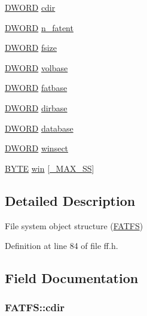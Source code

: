 \begin{DoxyCompactItemize}
\item 
\hyperlink{integer_8h_ad342ac907eb044443153a22f964bf0af}{D\+W\+O\+RD} \hyperlink{structFATFS_a217d0ce0c8cec84aa7f0c142679412c6}{cdir}
\item 
\hyperlink{integer_8h_ad342ac907eb044443153a22f964bf0af}{D\+W\+O\+RD} \hyperlink{structFATFS_a8da50eeba6469bc20d60ca0cf9a1307c}{n\+\_\+fatent}
\item 
\hyperlink{integer_8h_ad342ac907eb044443153a22f964bf0af}{D\+W\+O\+RD} \hyperlink{structFATFS_a53e9560659f14e66f306c2c444198bf3}{fsize}
\item 
\hyperlink{integer_8h_ad342ac907eb044443153a22f964bf0af}{D\+W\+O\+RD} \hyperlink{structFATFS_a8f0ca578755749d204f59dc83f1a7649}{volbase}
\item 
\hyperlink{integer_8h_ad342ac907eb044443153a22f964bf0af}{D\+W\+O\+RD} \hyperlink{structFATFS_a848fba02c4aabe02ef2984e578f33d64}{fatbase}
\item 
\hyperlink{integer_8h_ad342ac907eb044443153a22f964bf0af}{D\+W\+O\+RD} \hyperlink{structFATFS_a3f72fd998dbcce4652a85a81fe944bc4}{dirbase}
\item 
\hyperlink{integer_8h_ad342ac907eb044443153a22f964bf0af}{D\+W\+O\+RD} \hyperlink{structFATFS_a5b6c0bc2e9fd2ae8ef714210a74a2d5d}{database}
\item 
\hyperlink{integer_8h_ad342ac907eb044443153a22f964bf0af}{D\+W\+O\+RD} \hyperlink{structFATFS_ac60e69c00e6bf7c25febfbac4dc1476b}{winsect}
\item 
\hyperlink{integer_8h_a4ae1dab0fb4b072a66584546209e7d58}{B\+Y\+TE} \hyperlink{structFATFS_a7cc35a593465e727ab87723c14610644}{win} \mbox{[}\hyperlink{ffconf_8h_ac271b697378912f17132cb9c7d0de024}{\+\_\+\+M\+A\+X\+\_\+\+SS}\mbox{]}
\end{DoxyCompactItemize}


\subsection{Detailed Description}
File system object structure (\hyperlink{structFATFS}{F\+A\+T\+FS}) 

Definition at line 84 of file ff.\+h.



\subsection{Field Documentation}
\subsubsection[{\texorpdfstring{cdir}{cdir}}]{ F\+A\+T\+F\+S\+::cdir}\hypertarget{structFATFS_a217d0ce0c8cec84aa7f0c142679412c6}{}\label{structFATFS_a217d0ce0c8cec84aa7f0c142679412c6}


